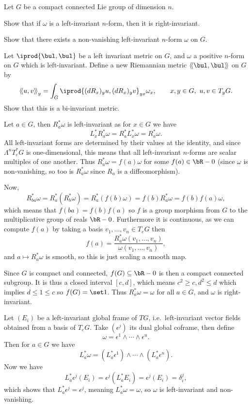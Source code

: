 \def\iiprod#1{\left<\!\left<#1\right>\!\right>}

\bprob[title={DoCarmo, Riemannian Geometry, page 46 question 7}]

    Let $G$ be a compact connected Lie group of dimension $n$.
    \benum
        \item Show that if $\omega$ is a left-invariant $n$-form, then it is right-invariant.
        \item Show that there exists a non-vanishing left-invariant $n$-form $\omega$ on $G$.
        \item Let $\iprod{\bul,\bul}$ be a left invariant metric on $G$, and $\omega$ a positive
        $n$-form on $G$ which is left-invariant.
        Define a new Riemannian metric $\iiprod{\bul,\bul}$ on $G$ by
        $$ \iiprod{u,v}_y = \int_G\iprod{(dR_x)_yu,(dR_x)_yv}_{yx}\omega_x,\qquad x,y\in G,\ u,v\in T_yG . $$
        Show that this is a bi-invariant metric.
    \eenum

\eprob

\benum
    \item Let $a\in G$, then $R^*_a\omega$ is left-invariant as for $x\in G$ we have
    $$ L^*_xR^*_a\omega = R^*_aL^*_x\omega = R^*_a\omega . $$
    All left-invariant forms are determined by their values at the identity, and since $\Lambda^n T^*_eG$ is
    one-dimensional, this means that all left-invariant $n$-forms are scalar multiples of one another.
    Thus $R^*_a\omega=f(a)\omega$ for some $f(a)\in\bR-0$ (since $\omega$ is non-vanishing, so too is $R^*_a\omega$
    since $R_a$ is a diffeomorphism).

    Now,
    $$ R^*_{ba}\omega = R^*_a(R^*_b\omega) = R^*_a(f(b)\omega) = f(b)R^*_a\omega = f(b)f(a)\omega , $$
    which means that $f(ba)=f(b)f(a)$ so $f$ is a group morphism from $G$ to the multiplicative group of reals $\bR-0$.
    Furthermore it is continuous, as we can compute $f(a)$ by taking a basis $v_1,\dots,v_n\in T_eG$ then
    $$ f(a) = \frac{R^*_a\omega(v_1,\dots,v_n)}{\omega(v_1,\dots,v_n)} , $$
    and $a\mapsto R^*_a\omega$ is smooth, so this is just scaling a smooth map.

    Since $G$ is compact and connected, $f(G)\subseteq\bR-0$ is then a compact connected subgroup.
    It is thus a closed interval $[c,d]$, which means $c^2\geq c,d^2\leq d$ which implies $d\leq1\leq c$ so
    $f(G)=\set1$.
    Thus $R^*_a\omega=\omega$ for all $a\in G$, and $\omega$ is right-invariant.

    \item Let $(E_i)$ be a left-invariant global frame of $TG$, i.e.\ left-invariant vector fields obtained from a basis
    of $T_eG$.
    Take $(\epsilon^j)$ its dual global coframe, then define
    $$ \omega = \epsilon^1\wedge\cdots\wedge\epsilon^n . $$
    Then for $a\in G$ we have
    $$ L^*_a\omega = (L^*_a\epsilon^1)\wedge\cdots\wedge(L^*_a\epsilon^n) . $$
    Now we have
    $$ L^*_a\epsilon^j(E_i) = \epsilon^j(L^*_aE_i) = \epsilon^j(E_i) = \delta^j_i , $$
    which shows that $L^*_a\epsilon^j=\epsilon^j$, meaning $L^*_a\omega=\omega$, so $\omega$ is left-invariant and
    non-vanishing.

